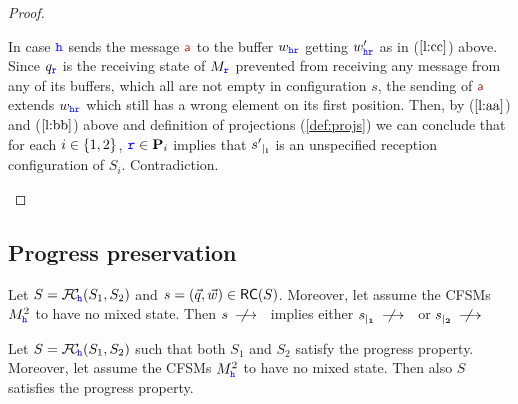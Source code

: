 \begin{proof}
\begin{description}
\begin{description}
In case ${\mathtt{\color{blue}{ {h}}}}$ sends the message $\msg[a]$ to the buffer $w_{{\mathtt{\color{blue}{ {h}}}}{\mathtt{\color{blue}{ {r}}}}}$ getting
$w'_{{\mathtt{\color{blue}{ {h}}}}{\mathtt{\color{blue}{ {r}}}}}$ as in ($\ref{l:cc}$) above. Since $q_{\mathtt{\color{blue}{ {r}}}}$ is the receiving state of $M_{\mathtt{\color{blue}{ {r}}}}$ prevented from receiving any message from any of its buffers, which all are not empty in configuration $s$, the sending of $\msg[a]$ extends $w_{{\mathtt{\color{blue}{ {h}}}}{\mathtt{\color{blue}{ {r}}}}}$ which still has a wrong element on its first position. Then, by ($\ref{l:aa}$) and ($\ref{l:bb}$) above 
and definition of projections (\cref{def:projs}) we can conclude that for each $i\in\{1,2\}$, 
${\mathtt{\color{blue}{ {r}}}}\in\mathbf{P}_i$ implies that ${s'}_{\mid_{\mathbf{i}}}$ is an unspecified reception configuration of $S_i$. Contradiction.
\end{description}
\end{description}
\end{proof}




\subsection{Progress preservation}

\begin{lemma}
Let $S = {\mathcal{F}\!\mathcal{C}}_{\!{\mathtt{\color{blue}{ {h}}}}}(S_1,S_2)$ and $s= (\vec{q},\vec{w}) \in \mathsf{RC}(S)$.
Moreover, let assume the CFSMs $M^2_{{\mathtt{\color{blue}{ {h}}}}}$ to have no mixed state.
Then $s\stackrel{}{\;\;\not\!\!\longrightarrow}\hspace{2mm}$ implies either ${s}_{\mid_{\mathbf{1}}}\stackrel{}{\;\;\not\!\!\longrightarrow}\hspace{2mm}$
or ${s}_{\mid_{\mathbf{2}}}\stackrel{}{\;\;\not\!\!\longrightarrow}$
\end{lemma}

\begin{proposition}%
\label{lem:restrRS}
Let $S = {\mathcal{F}\!\mathcal{C}}_{\!{\mathtt{\color{blue}{ {h}}}}}(S_1,S_2)$ such that both $S_1$ and $S_2$ satisfy 
the progress property. 
Moreover, let assume the CFSMs $M^2_{{\mathtt{\color{blue}{ {h}}}}}$ to have no mixed state.
Then also $S$ satisfies the progress property. 
\end{proposition}

